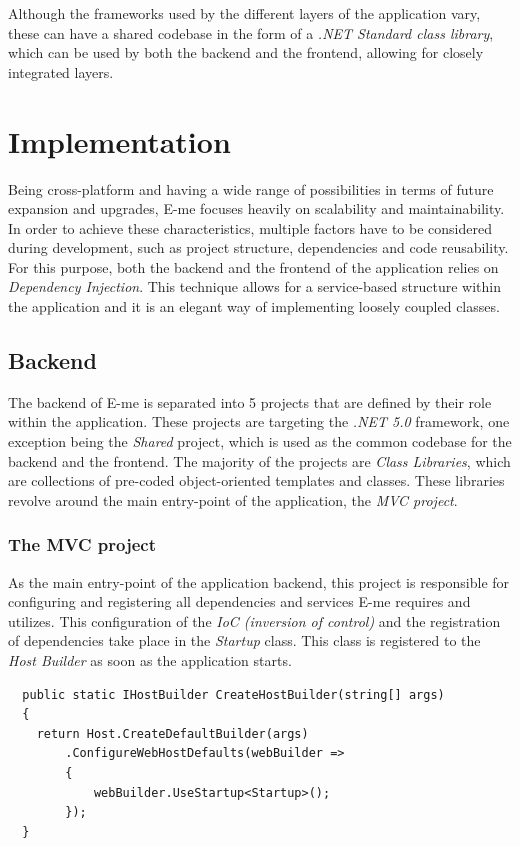 Although the frameworks used by the different layers of the application vary, these can have a shared codebase in the form
of a \emph{.NET Standard class library}, which can be used by both the backend and the frontend, allowing for closely integrated layers.

\section{Implementation}

Being cross-platform and having a wide range of possibilities in terms of future expansion and upgrades, E-me focuses heavily on scalability and maintainability.
In order to achieve these characteristics, multiple factors have to be considered during development, such as project structure, dependencies and code reusability.
For this purpose, both the backend and the frontend of the application relies on \emph{Dependency Injection}.
This technique allows for a service-based structure within the application and it is an elegant way of implementing loosely coupled classes.

\subsection{Backend}

The backend of E-me is separated into 5 projects that are defined by their role within the application.
These projects are targeting the \emph{.NET 5.0} framework, one exception being the \emph{Shared} project, which is used as the common
codebase for the backend and the frontend.
The majority of the projects are \emph{Class Libraries}, which are collections of pre-coded object-oriented templates and classes. 
These libraries revolve around the main entry-point of the application, the \emph{MVC project}.

\subsubsection{The MVC project}

As the main entry-point of the application backend, this project is responsible for configuring and registering all dependencies and services
E-me requires and utilizes.
This configuration of the \emph{IoC (inversion of control)} and the registration of dependencies take place in the \emph{Startup} class.
This class is registered to the \emph{Host Builder} as soon as the application starts.

\begin{lstlisting}
  public static IHostBuilder CreateHostBuilder(string[] args)
  {
	return Host.CreateDefaultBuilder(args)
		.ConfigureWebHostDefaults(webBuilder =>
		{
			webBuilder.UseStartup<Startup>();
		});
  }
\end{lstlisting}

